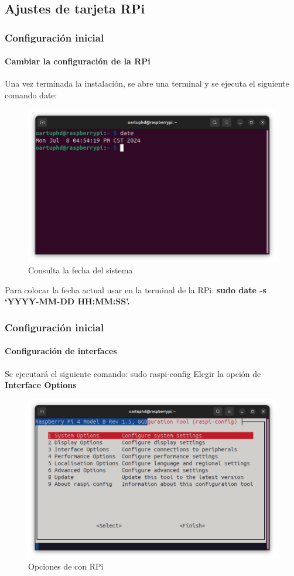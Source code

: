 \documentclass{beamer}
\begin{document}
	\subsection{Ajustes de tarjeta RPi}
	\begin{frame}
		\frametitle{Configuración inicial}
		\framesubtitle{Cambiar la configuración de la RPi}
		
		Una vez terminada la instalación, se abre una terminal y se ejecuta el siguiente comando date: 
		\begin{figure}
			\includegraphics[scale=0.25]{daterpi.png}
			\caption{Consulta la fecha del sistema}
		\end{figure}
		Para colocar la fecha actual usar en la terminal de la RPi: \textbf{sudo date -s ‘YYYY-MM-DD HH:MM:SS'.}
		
	\end{frame}
	
	\begin{frame}
		\frametitle{Configuración inicial}
		\framesubtitle{Configuración de interfaces}
		Se ejecutará el siguiente comando: sudo raspi-config \newline
		Elegir la opción de \textbf{Interface Options}
		\begin{figure}
			\includegraphics[scale=0.25]{configrpi.png}
			\caption{Opciones de con RPi}
		\end{figure}
	
		
	\end{frame}
	
\end{document}
